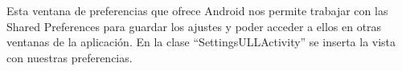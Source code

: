 

Esta ventana de preferencias que ofrece Android nos permite trabajar con las Shared Preferences para guardar los ajustes y poder acceder a ellos en otras ventanas de la aplicación. En la clase ``SettingsULLActivity'' se inserta la vista con nuestras preferencias.


